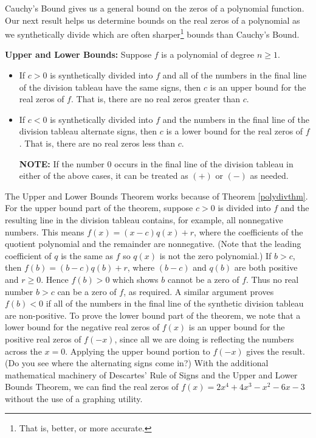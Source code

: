 \documentclass{ximera}
\begin{document}
Cauchy's Bound gives us a general bound on the zeros of a polynomial function.  Our next result helps us determine bounds on the real zeros of a polynomial as we synthetically divide which are often sharper\footnote{That is, better, or more accurate.} bounds than Cauchy's Bound.   

\smallskip

\begin{theorem}  \label{ULbounds} \textbf{Upper and Lower Bounds:}  Suppose $f$ is a polynomial of degree $n \geq 1$. 

\begin{itemize}

\item  If $c > 0$ is synthetically divided into $f$ and all of the numbers in the final line of the division tableau have the same signs, then $c$ is an upper bound for the real zeros of $f$.  That is, there are no real zeros greater than $c$.

\item  If $c < 0$ is synthetically divided into $f$ and the numbers in the final line of the division tableau alternate signs, then $c$ is a lower bound for the real zeros of $f$.  That is, there are no real zeros less than $c$.

\textbf{NOTE:}  If the number $0$ occurs in the final line of the division tableau in either of the above cases, it can be treated as $(+)$ or $(-)$ as needed.

\end{itemize}

\end{theorem}


\smallskip

The Upper and Lower Bounds Theorem works because of Theorem \ref{polydivthm}.  For the upper bound part of the theorem, suppose $c>0$ is divided into $f$ and the resulting line in the division tableau contains, for example, all nonnegative numbers.  This means $f(x) = (x-c) q(x) + r$, where the coefficients of the quotient polynomial and the remainder are nonnegative.  (Note that the leading coefficient of $q$ is the same as $f$ so $q(x)$ is not the zero polynomial.)  If $b > c$, then $f(b) = (b-c) q(b) + r$, where $(b-c)$ and  $q(b)$ are both positive and $r \geq 0$.  Hence $f(b) > 0$ which shows $b$ cannot be a zero of $f$.  Thus no real number $b > c$ can be a zero of $f$, as required.  A similar argument proves $f(b) < 0$ if all of the numbers in the final line of the synthetic division tableau are non-positive.  To prove the lower bound part of the theorem, we note that a lower bound for the negative real zeros of $f(x)$ is an upper bound for the positive real zeros of $f(-x)$, since all we are doing is reflecting the numbers across the $x=0$.  Applying the upper bound portion to $f(-x)$ gives the result.  (Do you see where the alternating signs come in?) With the additional mathematical machinery of Descartes' Rule of Signs and the Upper and Lower Bounds Theorem, we can find the real zeros of $f(x) = 2x^4+4x^3-x^2-6x-3$ without the use of a graphing utility.
\end{document}
